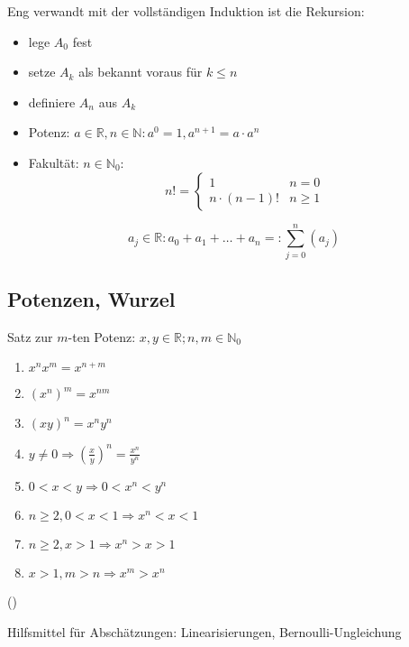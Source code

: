 Eng verwandt mit der vollständigen Induktion ist die Rekursion:
\begin{itemize}
 \item lege $A_0$ fest
 \item setze $A_k$ als bekannt voraus für $k \leq n$
 \item definiere $A_n$ aus $A_k$
\end{itemize}

\begin{example}[Standard]\flush
  \begin{itemize}
    \item Potenz: $a \in \mathbb{R}, n \in \mathbb{N}: a^0 = 1, a^{n+1} = a\cdot a^n$
    \item Fakultät: $n \in \mathbb{N}_0:$
    \begin{equation*} n! = \begin{cases} 1 & n = 0 \\ n \cdot (n-1)! & n \geq 1 \end{cases} \end{equation*}
  \end{itemize}
\end{example}

\begin{definition}[Summensymbol]
  \begin{equation*} a_j \in \mathbb{R}: a_0 + a_1 + \ldots + a_n =: \sum_{j=0}^{n} \left( a_j \right) \end{equation*}
\end{definition}

\subsection{Potenzen, Wurzel}

\begin{theorem} Satz zur $m$-ten Potenz:
  $x,y \in \mathbb{R}; n,m \in \mathbb{N}_0$
  \begin{enumerate}
   \item $x^nx^m = x^{n+m}$
   \item $(x^n)^m = x^{nm}$
   \item $(xy)^n = x^ny^n$
   \item $y \neq 0 \Rightarrow \left(\frac x y\right)^n = \frac{x^n}{y^n}$
   \item $0 < x < y \Rightarrow 0 < x^n < y^n$
   \item $n \geq 2, 0<x<1 \Rightarrow x^n<x<1$
   \item $n \geq 2, x > 1 \Rightarrow x^n>x>1$
   \item $x > 1, m > n \Rightarrow x^m > x^n$
  \end{enumerate}
  (\induction)
\end{theorem}
%
\noindent Hilfsmittel für Abschätzungen: Linearisierungen, Bernoulli-Ungleichung

